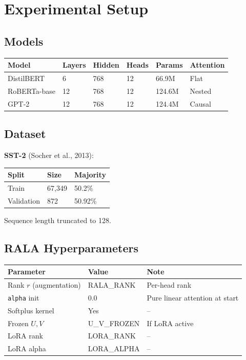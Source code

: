 
\section{Experimental Setup}

\subsection{Models}

\begin{table}[H]
\centering
\small
\begin{tabular}{llllll}
\toprule
\textbf{Model} & \textbf{Layers} & \textbf{Hidden} & \textbf{Heads} & \textbf{Params} & \textbf{Attention} \\
\midrule
DistilBERT & 6 & 768 & 12 & 66.9M & Flat \\
RoBERTa-base & 12 & 768 & 12 & 124.6M & Nested \\
GPT-2 & 12 & 768 & 12 & 124.4M & Causal \\
\bottomrule
\end{tabular}
\end{table}

\subsection{Dataset}

\textbf{SST-2} (Socher et al., 2013):

\begin{table}[H]
\centering
\small
\begin{tabular}{lll}
\toprule
\textbf{Split} & \textbf{Size} & \textbf{Majority} \\
\midrule
Train & 67,349 & 50.2\% \\
Validation & 872 & 50.92\% \\
\bottomrule
\end{tabular}
\end{table}

Sequence length truncated to 128.

\subsection{RALA Hyperparameters}

\begin{table}[H]
\centering
\small
\begin{tabular}{lll}
\toprule
\textbf{Parameter} & \textbf{Value} & \textbf{Note} \\
\midrule
Rank $r$ (augmentation) & {{RALA\_RANK}} & Per-head rank \\
\texttt{alpha} init & 0.0 & Pure linear attention at start \\
Softplus kernel & Yes & -- \\
Frozen $U, V$ & {{U\_V\_FROZEN}} & If LoRA active \\
LoRA rank & {{LORA\_RANK}} & -- \\
LoRA alpha & {{LORA\_ALPHA}} & -- \\
\bottomrule
\end{tabular}
\end{table}

